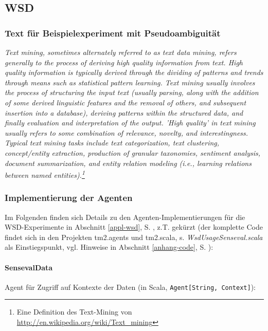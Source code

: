 \documentclass[abstracton, 12pt]{scrartcl}
\begin{document}
\subsection{WSD} \label{anhang-wsd} \label{ref-wsd}

\subsubsection{Text für Beispielexperiment mit Pseudoambiguität}

\emph{Text mining, sometimes alternately referred to as text data mining, refers generally to the process of deriving high quality information from text. High quality information is typically derived through the dividing of patterns and trends through means such as statistical pattern learning. Text mining usually involves the process of structuring the input text (usually parsing, along with the addition of some derived linguistic features and the removal of others, and subsequent insertion into a database), deriving patterns within the structured data, and finally evaluation and interpretation of the output. 'High quality' in text mining usually refers to some combination of relevance, novelty, and interestingness. Typical text mining tasks include text categorization, text clustering, concept/entity extraction, production of granular taxonomies, sentiment analysis, document summarization, and entity relation modeling (i.e., learning relations between named entities).\footnote{Eine Definition des Text-Mining von \url{http://en.wikipedia.org/wiki/Text_mining}}}

\subsubsection{Implementierung der Agenten} \label{anhang-wsd-agent-impl}

Im Folgenden finden sich Details zu den Agenten-Implementierungen für die WSD-Ex\-pe\-ri\-mente in Abschnitt \ref{appl-wsd}, S. \pageref{appl-wsd}, z.T. gekürzt (der komplette Code findet sich in den Projekten tm2.agents und tm2.scala, s. \emph{WsdUsageSenseval.scala} als Einstiegspunkt, vgl. Hinweise in Abschnitt \ref{anhang-code}, S. \pageref{anhang-code}):

\paragraph{SensevalData}

Agent für Zugriff auf Kontexte der Daten (in Scala, \lstinline!Agent[String, Context]!):
\end{document}
